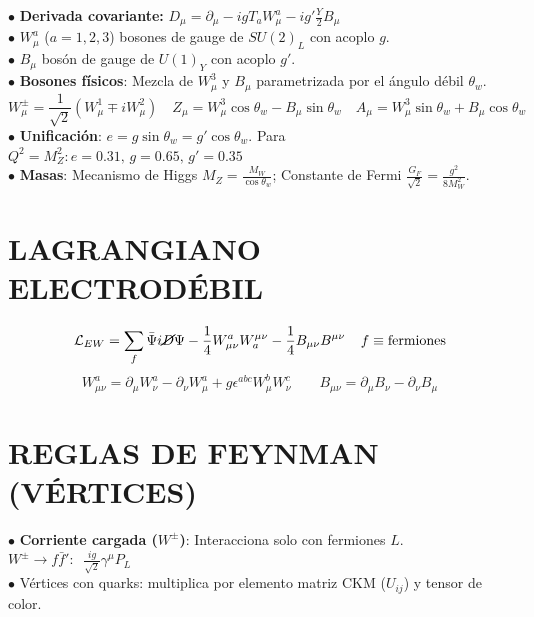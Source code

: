 $\bullet$ \textbf{Derivada covariante:} $D_\mu = \partial_\mu - igT_a W_\mu^a - ig'\frac{Y}{2}B_\mu$\\
$\bullet$ $W_\mu^a$ ($a=1,2,3$) bosones de gauge de $SU(2)_L$ con acoplo $g$. 
\\ $\bullet$ $B_\mu$ bosón de gauge de $U(1)_Y$ con acoplo $g'$.
\\ $\bullet$ \textbf{Bosones físicos}: Mezcla de $W_\mu^3$ y $B_\mu$ parametrizada por el ángulo débil $\theta_w$.
$$W_\mu^\pm = \frac{1}{\sqrt{2}}(W_\mu^1 \mp iW_\mu^2) \quad Z_\mu = W_\mu^3\cos\theta_w - B_\mu\sin\theta_w \quad A_\mu = W_\mu^3\sin\theta_w + B_\mu\cos\theta_w$$ 
$\bullet$ \textbf{Unificación}: $e = g \sin\theta_w = g' \cos\theta_w$. Para $Q^2= M_Z^2: e = 0.31, \, g = 0.65, \, g' =0.35$
\\ $\bullet$ \textbf{Masas}: Mecanismo de Higgs $M_Z = \frac{M_W}{\cos\theta_w}$; Constante de Fermi $\frac{G_F}{\sqrt{2}} = \frac{g^2}{8M_W^2}$. 

\section{LAGRANGIANO ELECTRODÉBIL}
\vspace{-2mm}
$$\mathcal{L}_{EW} = \sum_f \bar{\Psi}i\cancel{D}\Psi - \frac{1}{4}W_{\mu\nu}^a W_a^{\mu\nu} - \frac{1}{4}B_{\mu\nu}B^{\mu\nu}\;\;\;\;f \equiv \rm fermiones$$
$$W_{\mu\nu}^a = \partial_\mu W_\nu^a - \partial_\nu W_\mu^a + g\epsilon^{abc}W_\mu^b W_\nu^c \qquad B_{\mu\nu} = \partial_\mu B_\nu - \partial_\nu B_\mu$$ 

\section{REGLAS DE FEYNMAN (VÉRTICES)}
$\bullet$ \textbf{Corriente cargada ($W^\pm$)}: Interacciona solo con fermiones $L$. $W^\pm \rightarrow f \bar{f}': \;\; \frac{ig}{\sqrt{2}}\gamma^\mu P_L$
\\$\bullet$ Vértices con quarks: multiplica por elemento matriz CKM ($U_{ij}$) y tensor de color. 


